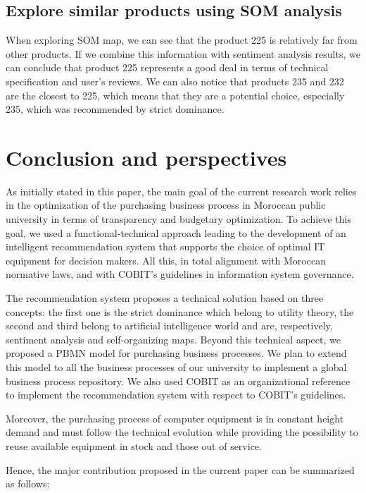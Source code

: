 \documentclass[preprint,3p,onecolumn]{elsarticle}
\begin{document}
\subsection{Explore similar products using SOM analysis}
\par When exploring SOM map, we can see that the product 225 is relatively far from other products. If we combine this information with sentiment analysis results, we can conclude that product 225 represents a good deal in terms of technical specification and user’s reviews. We can also notice that products 235 and 232 are the closest to 225, which means that they are a potential choice, especially 235, which was recommended by strict dominance.

\section{Conclusion and perspectives}
\par As initially stated in this paper, the main goal of the current research work relies in the optimization of the purchasing business process in Moroccan public university in terms of transparency and budgetary optimization.  To achieve this goal, we used a functional-technical approach leading to the development of an intelligent recommendation system that supports the choice of optimal IT equipment for decision makers. All this, in total alignment with Moroccan normative laws, and with COBIT’s guidelines in information system governance.

\par The recommendation system proposes a technical solution based on three concepts: the first one is the strict dominance which belong to utility theory, the second and third belong to artificial intelligence world and are, respectively, sentiment analysis and self-organizing maps. Beyond this technical aspect, we proposed a PBMN model for purchasing business processes. We plan to extend this model to all the business processes of our university to implement a global business process repository. We also used COBIT as an organizational reference to implement the recommendation system with respect to COBIT's guidelines.

\par Moreover, the purchasing process of computer equipment is in constant height demand and must follow the technical evolution while providing the possibility to reuse available equipment in stock and those out of service.


\par Hence, the major contribution proposed in the current paper can be summarized as follows:
\end{document}
